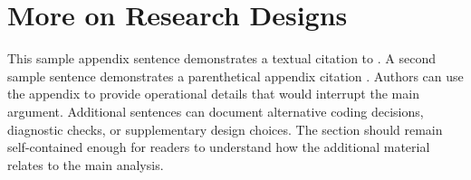 \section{More on Research Designs}
\label{app:research-design}

This sample appendix sentence demonstrates a textual citation to . A second sample sentence demonstrates a parenthetical appendix citation . Authors can use the appendix to provide operational details that would interrupt the main argument. Additional sentences can document alternative coding decisions, diagnostic checks, or supplementary design choices. The section should remain self-contained enough for readers to understand how the additional material relates to the main analysis.

